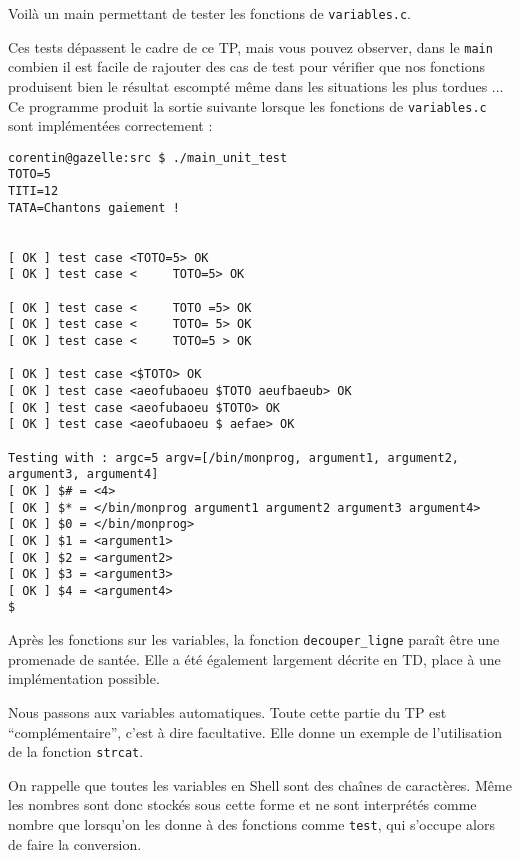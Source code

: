 \documentclass[10pt]{article}
\begin{document}
\begin{enumerate}[label=\textbf{[\alph*]}]
  \vspace{0.2cm}
  Voilà un main permettant de tester les fonctions de
  \texttt{variables.c}.

  

  \vspace{0.2cm}
  Ces tests dépassent le cadre de ce TP, mais vous pouvez observer,
  dans le \texttt{main} combien il est facile de rajouter des cas de
  test pour vérifier que nos fonctions produisent bien le résultat
  escompté même dans les situations les plus tordues ... Ce programme
  produit la sortie suivante lorsque les fonctions de
  \texttt{variables.c} sont implémentées correctement :

\begin{verbatim}
corentin@gazelle:src $ ./main_unit_test
TOTO=5
TITI=12
TATA=Chantons gaiement !


[ OK ] test case <TOTO=5> OK
[ OK ] test case <     TOTO=5> OK

[ OK ] test case <     TOTO =5> OK
[ OK ] test case <     TOTO= 5> OK
[ OK ] test case <     TOTO=5 > OK

[ OK ] test case <$TOTO> OK
[ OK ] test case <aeofubaoeu $TOTO aeufbaeub> OK
[ OK ] test case <aeofubaoeu $TOTO> OK
[ OK ] test case <aeofubaoeu $ aefae> OK

Testing with : argc=5 argv=[/bin/monprog, argument1, argument2, argument3, argument4]
[ OK ] $# = <4>
[ OK ] $* = </bin/monprog argument1 argument2 argument3 argument4>
[ OK ] $0 = </bin/monprog>
[ OK ] $1 = <argument1>
[ OK ] $2 = <argument2>
[ OK ] $3 = <argument3>
[ OK ] $4 = <argument4>
$
\end{verbatim}

\item Après les fonctions sur les variables, la fonction
  \texttt{decouper\_ligne} paraît être une promenade de santée. Elle a
  été également largement décrite en TD, place à une implémentation
  possible.

  

  \vspace{0.2cm}

\item Nous passons aux variables automatiques. Toute cette partie du
  TP est ``complémentaire'', c'est à dire facultative. Elle donne un
  exemple de l'utilisation de la fonction \texttt{strcat}.

  \vspace{0.2cm}
  On rappelle que toutes les variables en Shell sont des chaînes de
  caractères. Même les nombres sont donc stockés sous cette forme et
  ne sont interprétés comme nombre que lorsqu'on les donne à des
  fonctions comme \texttt{test}, qui s'occupe alors de faire la
  conversion.


\end{enumerate}
\end{document}
